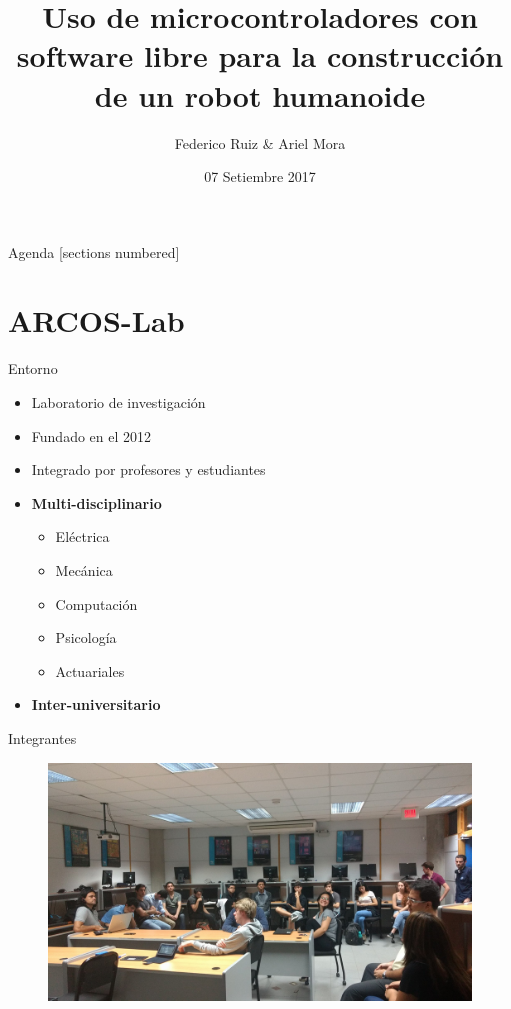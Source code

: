 \documentclass[10pt]{beamer}
\title{Uso de microcontroladores con software libre para la construcción de un robot humanoide}
\date{07 Setiembre 2017}
\author{Federico Ruiz \& Ariel Mora}
\institute{Escuela de Ingeniería Eléctrica}
\begin{document}
\maketitle

\begin{frame}{Agenda}
  [sections numbered]
  \tableofcontents[hideallsubsections]
\end{frame}

\section{ARCOS-Lab}

\begin{frame}{Entorno}
	\begin{itemize}
		\item Laboratorio de investigación
        \item Fundado en el 2012
        \item Integrado por profesores y estudiantes
        \item \textbf{Multi-disciplinario}
        	\begin{itemize}
        		\item Eléctrica
                \item Mecánica
                \item Computación
                \item Psicología
                \item Actuariales
        	\end{itemize}
        \item \textbf{Inter-universitario}
	\end{itemize}
\end{frame}

\begin{frame}{Integrantes}
	\begin{center}
       \begin{figure}
           \includegraphics[width=1\textwidth]{img/integrantes.jpg}
       \end{figure}
    \end{center}
\end{frame}
\end{document}
